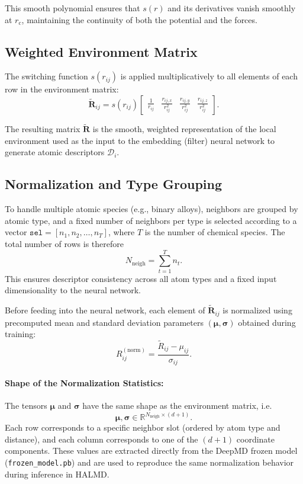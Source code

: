 \documentclass[12pt,a4paper]{article}
\begin{document}
This smooth polynomial ensures that $s(r)$ and its derivatives vanish smoothly at $r_{\mathrm{c}}$, maintaining the continuity of both the potential and the forces.

\subsection*{Weighted Environment Matrix}

The switching function $s(r_{ij})$ is applied multiplicatively to all elements of each row in the environment matrix:
\[
\tilde{\mathbf{R}}_{ij} =
s(r_{ij})
\begin{bmatrix}
\frac{1}{r_{ij}} & \frac{r_{ij,x}}{r_{ij}^2} & \frac{r_{ij,y}}{r_{ij}^2} & \frac{r_{ij,z}}{r_{ij}^2}
\end{bmatrix}.
\]

The resulting matrix $\tilde{\mathbf{R}}$ is the smooth, weighted representation of the local environment used as the input to the embedding (filter) neural network to generate atomic descriptors $\mathcal{D}_i$.

\subsection*{Normalization and Type Grouping}

To handle multiple atomic species (e.g., binary alloys), neighbors are grouped by atomic type, and a fixed number of neighbors per type is selected according to a vector $\texttt{sel} = [n_1, n_2, \dots, n_T]$, where $T$ is the number of chemical species.  
The total number of rows is therefore
\[
N_{\mathrm{neigh}} = \sum_{t=1}^{T} n_t.
\]
This ensures descriptor consistency across all atom types and a fixed input dimensionality to the neural network.

Before feeding into the neural network, each element of $\tilde{\mathbf{R}}_{ij}$ is normalized using precomputed mean and standard deviation parameters $(\boldsymbol{\mu}, \boldsymbol{\sigma})$ obtained during training:
\[
R_{ij}^{\mathrm{(norm)}} = \frac{\tilde{R}_{ij} - \mu_{ij}}{\sigma_{ij}}.
\]

\paragraph{Shape of the Normalization Statistics:}
The tensors $\boldsymbol{\mu}$ and $\boldsymbol{\sigma}$ have the same shape as the environment matrix, i.e.
\[
\boldsymbol{\mu}, \boldsymbol{\sigma} \in \mathbb{R}^{N_{\mathrm{neigh}} \times (d+1)}.
\]
Each row corresponds to a specific neighbor slot (ordered by atom type and distance), and each column corresponds to one of the $(d+1)$ coordinate components.  
These values are extracted directly from the DeepMD frozen model (\texttt{frozen\_model.pb}) and are used to reproduce the same normalization behavior during inference in HALMD.
\end{document}
